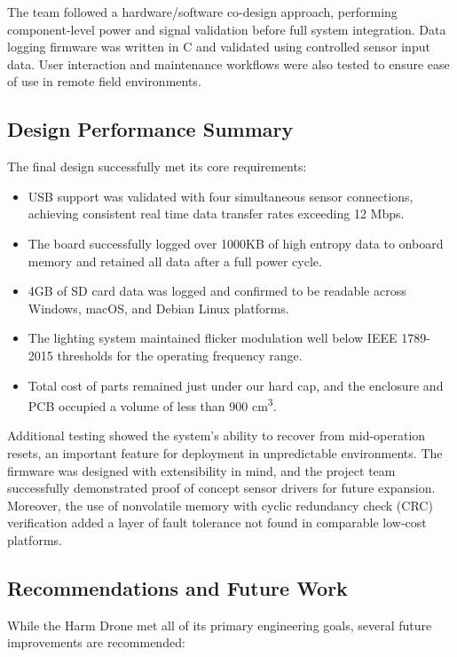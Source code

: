 \documentclass[12pt]{article}
\begin{document}
\par The team followed a hardware/software co-design approach, performing component-level power and signal validation before full system integration. Data logging firmware was written in C and validated using controlled sensor input data. User interaction and maintenance workflows were also tested to ensure ease of use in remote field environments.

\subsection{Design Performance Summary}

The final design successfully met its core requirements:

\begin{itemize}
\item USB support was validated with four simultaneous sensor connections, achieving consistent real time data transfer rates exceeding 12 Mbps.
\item The board successfully logged over 1000KB of high entropy data to onboard memory and retained all data after a full power cycle.
\item 4GB of SD card data was logged and confirmed to be readable across Windows, macOS, and Debian Linux platforms.
\item The lighting system maintained flicker modulation well below IEEE 1789-2015 thresholds for the operating frequency range.
\item Total cost of parts remained just under our hard cap, and the enclosure and PCB occupied a volume of less than 900 cm\textsuperscript{3}.
\end{itemize}

\par Additional testing showed the system’s ability to recover from mid-operation resets, an important feature for deployment in unpredictable environments. The firmware was designed with extensibility in mind, and the project team successfully demonstrated proof of concept sensor drivers for future expansion. Moreover, the use of nonvolatile memory with cyclic redundancy check (CRC) verification added a layer of fault tolerance not found in comparable low-cost platforms.

\subsection{Recommendations and Future Work}

While the Harm Drone met all of its primary engineering goals, several future improvements are recommended:
\end{document}
